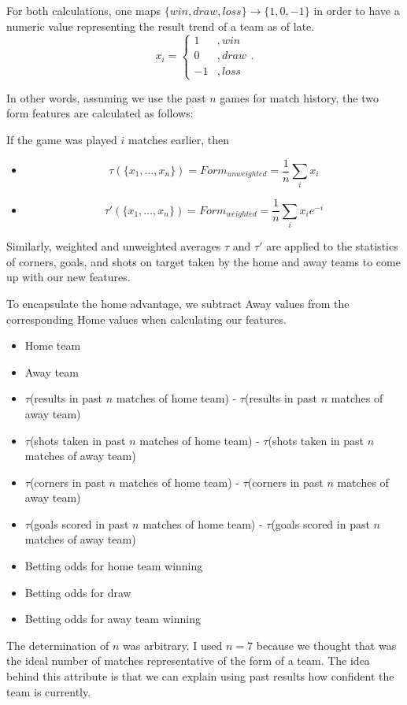 \documentclass[paper=a4, fontsize=11pt]{scrartcl}
\numberwithin{equation}{section}		%
\numberwithin{figure}{section}			%
\numberwithin{table}{section}				%
\begin{document}
For both calculations, one maps $\{win, draw, loss\} \to \{1, 0, -1\}$ in order to have a numeric value representing the result trend of a team as of late. $$x_i = \begin{cases} 1&, win \\ 0&, draw \\ -1&, loss \end{cases}.$$

In other words, assuming we use the past $n$ games for match history, the two form features are calculated as follows:

If the game was played $i$ matches earlier, then
\begin{itemize}
\item $$\tau(\{ x_1,\ldots,x_n\}) = Form_{unweighted} = \frac{1}{n} \sum_i x_i$$
\item $$\tau'(\{ x_1,\ldots,x_n\}) = Form_{weighted} = \frac{1}{n} \sum_i x_i e^{-i}$$
\end{itemize}

Similarly, weighted and unweighted averages $\tau$ and $\tau'$ are applied to the statistics of corners, goals, and shots on target taken by the home and away teams to come up with our new features.

To encapsulate the home advantage, we subtract Away values from the corresponding Home values when calculating our features.

\begin{itemize}
\item Home team
\item Away team
\item $\tau$(results in past $n$ matches of home team) - $\tau$(results in past $n$ matches of away team)
\item $\tau$(shots taken in past $n$ matches of home team) - $\tau$(shots taken in past $n$ matches of away team)
\item $\tau$(corners in past $n$ matches of home team) - $\tau$(corners in past $n$ matches of away team)
\item $\tau$(goals scored in past $n$ matches of home team) - $\tau$(goals scored in past $n$ matches of away team)
\item Betting odds for home team winning
\item Betting odds for draw
\item Betting odds for away team winning
\end{itemize}

The determination of $n$ was arbitrary. I used $n=7$ because we thought that was the ideal number of matches representative of the form of a team. The idea behind this attribute is that we can explain using past results how confident the team is currently. 
\end{document}
